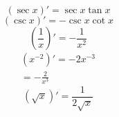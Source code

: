 \documentclass[a4paper,12pt,numbers=noenddot]{scrreprt}
\begin{document}
\begin{center}
\begin{multicols}{4}
\begin{equation*}
        \end{equation*}
        \begin{equation*}
            (\sec x)' = \sec x \tan x
        \end{equation*}
        \begin{equation*}
            (\csc x)' = -\csc x \cot x
        \end{equation*}
        \begin{equation*}
            (\frac{1}{x})' = -\frac{1}{x^2}
        \end{equation*} 
        \begin{align*}
            (x^{-2})' = -2x^{-3}\\
            = -\frac{2}{x^3}
        \end{align*}
        \begin{equation*}
            (\sqrt{x})' = \frac{1}{2\sqrt{x}}
        \end{equation*}
    \end{multicols}
\end{center}
    \newpage
\end{document}
